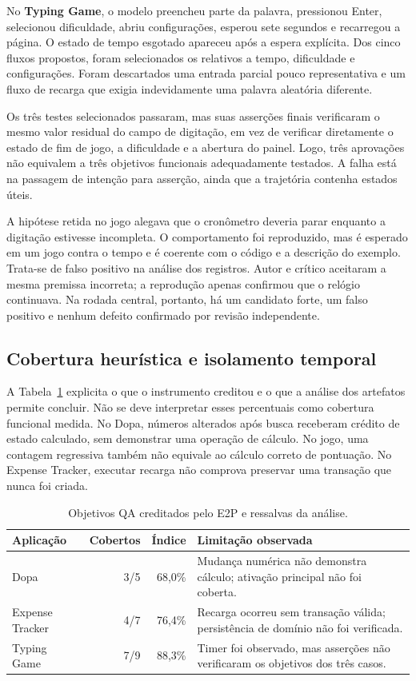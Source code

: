 \documentclass[12pt]{article}
\begin{document}
No \textbf{Typing Game}, o modelo preencheu parte da palavra, pressionou Enter, selecionou dificuldade, abriu configurações, esperou sete segundos e recarregou a página. O estado de tempo esgotado apareceu após a espera explícita. Dos cinco fluxos propostos, foram selecionados os relativos a tempo, dificuldade e configurações. Foram descartados uma entrada parcial pouco representativa e um fluxo de recarga que exigia indevidamente uma palavra aleatória diferente.

Os três testes selecionados passaram, mas suas asserções finais verificaram o mesmo valor residual do campo de digitação, em vez de verificar diretamente o estado de fim de jogo, a dificuldade e a abertura do painel. Logo, três aprovações não equivalem a três objetivos funcionais adequadamente testados. A falha está na passagem de intenção para asserção, ainda que a trajetória contenha estados úteis.

A hipótese retida no jogo alegava que o cronômetro deveria parar enquanto a digitação estivesse incompleta. O comportamento foi reproduzido, mas é esperado em um jogo contra o tempo e é coerente com o código e a descrição do exemplo. Trata-se de falso positivo na análise dos registros. Autor e crítico aceitaram a mesma premissa incorreta; a reprodução apenas confirmou que o relógio continuava. Na rodada central, portanto, há um candidato forte, um falso positivo e nenhum defeito confirmado por revisão independente.

\subsection{Cobertura heurística e isolamento temporal}
A Tabela~\ref{tab:coverage} explicita o que o instrumento creditou e o que a análise dos artefatos permite concluir. Não se deve interpretar esses percentuais como cobertura funcional medida. No Dopa, números alterados após busca receberam crédito de estado calculado, sem demonstrar uma operação de cálculo. No jogo, uma contagem regressiva também não equivale ao cálculo correto de pontuação. No Expense Tracker, executar recarga não comprova preservar uma transação que nunca foi criada.

\begin{table}[ht]
\centering
\caption{Objetivos QA creditados pelo E2P e ressalvas da análise.}
\label{tab:coverage}
\small
\begin{tabular}{>{\raggedright\arraybackslash}p{3.1cm}rr>{\raggedright\arraybackslash}p{6.4cm}}
\toprule
Aplicação & Cobertos & Índice & Limitação observada\\
\midrule
Dopa & 3/5 & 68,0\% & Mudança numérica não demonstra cálculo; ativação principal não foi coberta.\\
Expense Tracker & 4/7 & 76,4\% & Recarga ocorreu sem transação válida; persistência de domínio não foi verificada.\\
Typing Game & 7/9 & 88,3\% & Timer foi observado, mas asserções não verificaram os objetivos dos três casos.\\
\bottomrule
\end{tabular}
\end{table}
\end{document}
